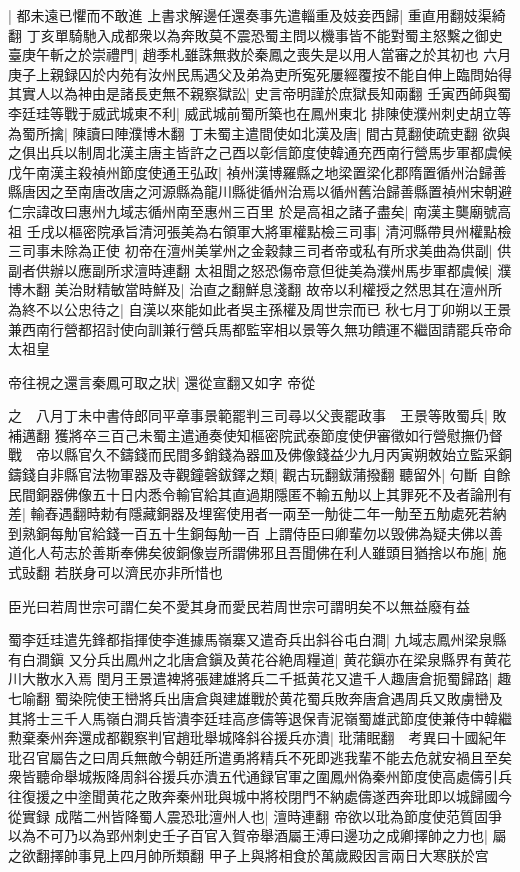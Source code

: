 |{
	都未遠已懼而不敢進}
上書求解邊任還奏事先遣輜重及妓妾西歸|{
	重直用翻妓渠綺翻}
丁亥單騎馳入成都衆以為奔敗莫不震恐蜀主問以機事皆不能對蜀主怒繫之御史臺庚午斬之於崇禮門|{
	趙季札雖誅無救於秦鳳之喪失是以用人當審之於其初也}
六月庚子上親録囚於内苑有汝州民馬遇父及弟為吏所寃死屢經覆按不能自伸上臨問始得其實人以為神由是諸長吏無不親察獄訟|{
	史言帝明謹於庶獄長知兩翻}
壬寅西師與蜀李廷珪等戰于威武城東不利|{
	威武城前蜀所築也在鳳州東北}
排陳使濮州刺史胡立等為蜀所擒|{
	陳讀曰陣濮博木翻}
丁未蜀主遣間使如北漢及唐|{
	間古莧翻使疏吏翻}
欲與之俱出兵以制周北漢主唐主皆許之己酉以彰信節度使韓通充西南行營馬步軍都虞候　戊午南漢主殺禎州節度使通王弘政|{
	禎州漢博羅縣之地梁置梁化郡隋置循州治歸善縣唐因之至南唐改唐之河源縣為龍川縣徙循州治焉以循州舊治歸善縣置禎州宋朝避仁宗諱改曰惠州九域志循州南至惠州三百里}
於是高祖之諸子盡矣|{
	南漢主龑廟號高祖}
壬戌以樞密院承旨清河張美為右領軍大將軍權點檢三司事|{
	清河縣帶貝州權點檢三司事未除為正使}
初帝在澶州美掌州之金穀隸三司者帝或私有所求美曲為供副|{
	供副者供辦以應副所求澶時連翻}
太祖聞之怒恐傷帝意但徙美為濮州馬步軍都虞候|{
	濮博木翻}
美治財精敏當時鮮及|{
	治直之翻鮮息淺翻}
故帝以利權授之然思其在澶州所為終不以公忠待之|{
	自漢以來能如此者吳主孫權及周世宗而已}
秋七月丁卯朔以王景兼西南行營都招討使向訓兼行營兵馬都監宰相以景等久無功饋運不繼固請罷兵帝命太祖皇

帝往視之還言秦鳳可取之狀|{
	還從宣翻又如字}
帝從

之　八月丁未中書侍郎同平章事景範罷判三司尋以父喪罷政事　王景等敗蜀兵|{
	敗補邁翻}
獲將卒三百己未蜀主遣通奏使知樞密院武泰節度使伊審徵如行營慰撫仍督戰　帝以縣官久不鑄錢而民間多銷錢為器皿及佛像錢益少九月丙寅朔敇始立監采銅鑄錢自非縣官法物軍器及寺觀鐘磬鈸鐸之類|{
	觀古玩翻鈸蒲撥翻}
聽留外|{
	句斷}
自餘民間銅器佛像五十日内悉令輸官給其直過期隱匿不輸五觔以上其罪死不及者論刑有差|{
	輸舂遇翻時勅有隱藏銅器及埋窖使用者一兩至一觔徙二年一觔至五觔處死若納到熟銅每觔官給錢一百五十生銅每觔一百}
上謂侍臣曰卿輩勿以毁佛為疑夫佛以善道化人苟志於善斯奉佛矣彼銅像豈所謂佛邪且吾聞佛在利人雖頭目猶捨以布施|{
	施式䜴翻}
若朕身可以濟民亦非所惜也

臣光曰若周世宗可謂仁矣不愛其身而愛民若周世宗可謂明矣不以無益廢有益

蜀李廷珪遣先鋒都指揮使李進據馬嶺寨又遣奇兵出斜谷屯白澗|{
	九域志鳳州梁泉縣有白澗鎭}
又分兵出鳳州之北唐倉鎭及黄花谷絶周糧道|{
	黄花鎭亦在梁泉縣界有黄花川大散水入焉}
閏月王景遣裨將張建雄將兵二千抵黄花又遣千人趣唐倉扼蜀歸路|{
	趣七喻翻}
蜀染院使王巒將兵出唐倉與建雄戰於黄花蜀兵敗奔唐倉遇周兵又敗虜巒及其將士三千人馬嶺白澗兵皆潰李廷珪高彦儔等退保青泥嶺蜀雄武節度使兼侍中韓繼勲棄秦州奔還成都觀察判官趙玭舉城降斜谷援兵亦潰|{
	玭蒲眠翻　考異曰十國紀年玭召官屬告之曰周兵無敵今朝廷所遣勇將精兵不死即逃我輩不能去危就安禍且至矣衆皆聽命舉城叛降周斜谷援兵亦潰五代通録官軍之圍鳳州偽秦州節度使高處儔引兵往復援之中塗聞黄花之敗奔秦州玭與城中將校閉門不納處儔遂西奔玭即以城歸國今從實録}
成階二州皆降蜀人震恐玭澶州人也|{
	澶時連翻}
帝欲以玭為節度使范質固爭以為不可乃以為郢州刺史壬子百官入賀帝舉酒屬王溥曰邊功之成卿擇帥之力也|{
	屬之欲翻擇帥事見上四月帥所類翻}
甲子上與將相食於萬歲殿因言兩日大寒朕於宫

